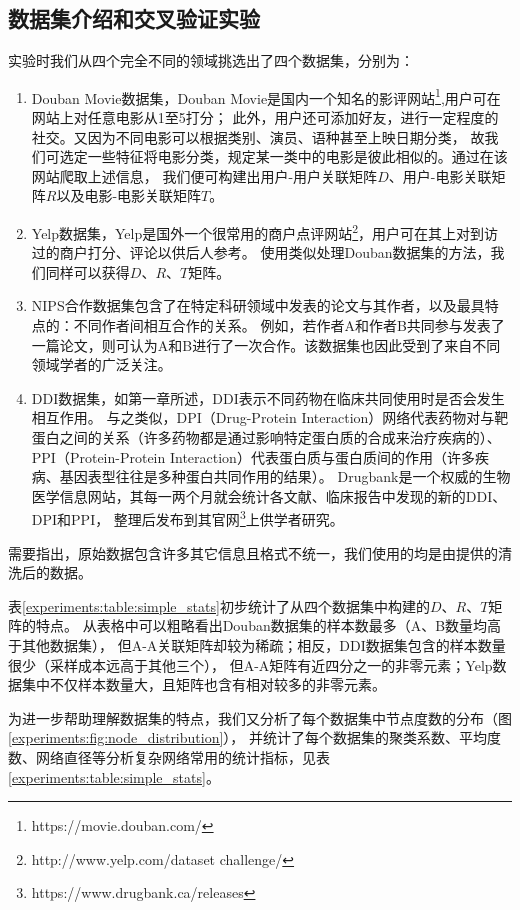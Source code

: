 \subsection{数据集介绍和交叉验证实验}
\label{experiments:sec:db_cv}
实验时我们从四个完全不同的领域挑选出了四个数据集，分别为：
\begin{enumerate}
    \item Douban Movie数据集，Douban Movie是国内一个知名的影评网站\footnote{https://movie.douban.com/},用户可在网站上对任意电影从1至5打分；
    此外，用户还可添加好友，进行一定程度的社交。又因为不同电影可以根据类别、演员、语种甚至上映日期分类，
    故我们可选定一些特征将电影分类，规定某一类中的电影是彼此相似的。通过在该网站爬取上述信息，
    我们便可构建出用户-用户关联矩阵$D$、用户-电影关联矩阵$R$以及电影-电影关联矩阵$T$。
    \item Yelp数据集，Yelp是国外一个很常用的商户点评网站\footnote{http://www.yelp.com/dataset challenge/}，用户可在其上对到访过的商户打分、评论以供后人参考。
    使用类似处理Douban数据集的方法，我们同样可以获得$D$、$R$、$T$矩阵。
    \item NIPS合作数据集包含了在特定科研领域中发表的论文与其作者，以及最具特点的：不同作者间相互合作的关系。
    例如，若作者A和作者B共同参与发表了一篇论文，则可认为A和B进行了一次合作。该数据集也因此受到了来自不同领域学者的广泛关注。
    \item DDI数据集，如第一章所述，DDI表示不同药物在临床共同使用时是否会发生相互作用。
    与之类似，DPI（Drug-Protein Interaction）网络代表药物对与靶蛋白之间的关系（许多药物都是通过影响特定蛋白质的合成来治疗疾病的）、
    PPI（Protein-Protein Interaction）代表蛋白质与蛋白质间的作用（许多疾病、基因表型往往是多种蛋白共同作用的结果）。
    Drugbank是一个权威的生物医学信息网站，其每一两个月就会统计各文献、临床报告中发现的新的DDI、DPI和PPI，
    整理后发布到其官网\footnote{https://www.drugbank.ca/releases}上供学者研究。
\end{enumerate}


需要指出，原始数据包含许多其它信息且格式不统一，我们使用的均是由\cite{zhang2018prioritizing}提供的清洗后的数据。


表\ref{experiments:table:simple_stats}初步统计了从四个数据集中构建的$D$、$R$、$T$矩阵的特点。
从表格中可以粗略看出Douban数据集的样本数最多（A、B数量均高于其他数据集），
但A-A关联矩阵却较为稀疏；相反，DDI数据集包含的样本数量很少（采样成本远高于其他三个），
但A-A矩阵有近四分之一的非零元素；Yelp数据集中不仅样本数量大，且矩阵也含有相对较多的非零元素。


为进一步帮助理解数据集的特点，我们又分析了每个数据集中节点度数的分布（图\ref{experiments:fig:node_distribution}），
并统计了每个数据集的聚类系数、平均度数、网络直径等分析复杂网络常用的统计指标，见表\ref{experiments:table:simple_stats}。


